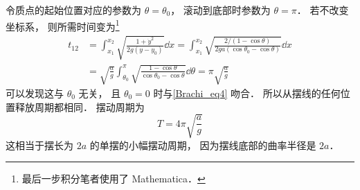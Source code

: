 令质点的起始位置对应的参数为 $\theta = \theta_0$， 滚动到底部时参数为 $\theta = \pi$．
若不改变坐标系， 则所需时间变为\footnote{最后一步积分笔者使用了 Mathematica．}
\begin{equation}
\begin{aligned}
t_{12} &= \int_{x_1}^{x_2} \sqrt{\frac{1 + \dot{y}^2}{2g(y - y_0)}} \dd{x}
= \int_{x_1}^{x_2} \sqrt{\frac{2/(1 - \cos\theta)}{2ga(\cos\theta_0 - \cos\theta)}} \dd{x}\\
&= \sqrt{\frac{a}{g}}\int_{\theta_0}^{\pi} \sqrt{\frac{1 - \cos\theta}{\cos\theta_0 - \cos\theta}} \dd{\theta}
= \pi\sqrt{\frac{a}{g}}
\end{aligned}
\end{equation}
可以发现这与 $\theta_0$ 无关， 且 $\theta_0 = 0$ 时与\autoref{Brachi_eq4} 吻合． 所以从摆线的任何位置释放周期都相同． 摆动周期为
\begin{equation}
T = 4\pi\sqrt{\frac{a}{g}}
\end{equation}
这相当于摆长为 $2a$ 的单摆的小幅摆动周期， 因为摆线底部的曲率半径是 $2a$．
